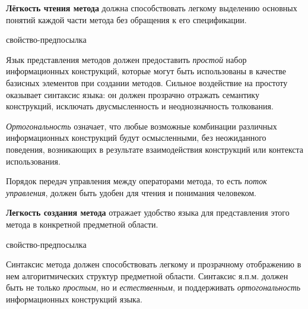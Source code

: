 \textbf{Лёгкость чтения метода} должна способствовать легкому выделению основных понятий каждой части метода без обращения к его спецификации.

\begin{SCn}
\begin{scnrelfromlist}{свойство-предпосылка}
\end{scnrelfromlist}
\end{SCn}

Язык представления методов должен предоставить \textit{простой} набор информационных конструкций, которые могут быть использованы в качестве базисных элементов при создании методов.
Сильное воздействие на простоту оказывает синтаксис языка: он должен прозрачно отражать
семантику конструкций, исключать двусмысленность и неоднозначность толкования.

\textit{Ортогональность} означает, что любые возможные комбинации различных информационных конструкций будут осмысленными, без неожиданного поведения, возникающих в результате взаимодействия конструкций или контекста использования.

Порядок передач управления между операторами метода, то есть \textit{поток управления}, должен быть удобен для чтения и понимания человеком.

\textbf{Легкость создания метода} отражает удобство языка для представления этого метода в конкретной предметной области.

\begin{SCn}
\begin{scnrelfromlist}{свойство-предпосылка}
\end{scnrelfromlist}
\end{SCn}

Синтаксис метода должен способствовать легкому и прозрачному отображению в нем алгоритмических структур предметной области. Синтаксис я.п.м. должен быть не только \textit{простым}, но и \textit{естественным}, и поддерживать \textit{ортогональность} информационных конструкций языка.

